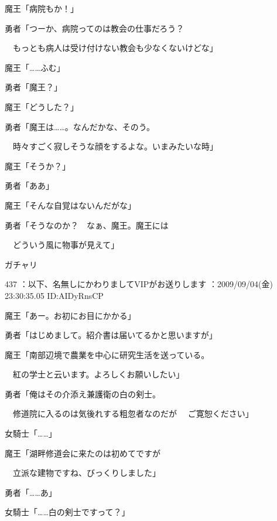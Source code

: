\documentclass[a4j,twocolumn]{tarticle}
\begin{document}
魔王「病院もか！」 \par{}
勇者「つーか、病院ってのは教会の仕事だろう？\par{} 
　もっとも病人は受け付けない教会も少なくないけどな」 



魔王「……ふむ」\par{} 
勇者「魔王？」 



魔王「どうした？」\par{} 
勇者「魔王は……。なんだかな、そのう。\par{} 
　時々すごく寂しそうな顔をするよな。いまみたいな時」 



魔王「そうか？」\par{} 
勇者「ああ」 



魔王「そんな自覚はないんだがな」\par{} 
勇者「そうなのか？　なぁ、魔王。魔王には\par{} 
　どういう風に物事が見えて」 



ガチャリ 

	
    
    

437 ：以下、名無しにかわりましてVIPがお送りします ：2009/09/04(金) 23:30:35.05 ID:AIDyRnsCP 


魔王「あー。お初にお目にかかる」\par{} 
勇者「はじめまして。紹介書は届いてるかと思いますが」 



魔王「南部辺境で農業を中心に研究生活を送っている。\par{} 
　紅の学士と云います。よろしくお願いしたい」 



勇者「俺はその介添え兼護衛の白の剣士。\par{} 
　修道院に入るのは気後れする粗忽者なのだが 
　ご寛恕ください」 



女騎士「……」 



魔王「湖畔修道会に来たのは初めてですが\par{} 
　立派な建物ですね、びっくりしました」 



勇者「……あ」\par{} 
女騎士「……白の剣士ですって？」 
\end{document}

